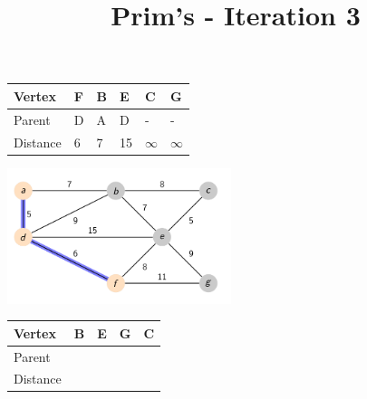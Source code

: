 \documentclass{beamer}
\begin{document}
\begin{frame}[fragile]
    \title{Prim's - Iteration 3}
    \centering
    \begin{table}[]
        \begin{tabular}{|l|l|l|l|l|l|}
            \hline
            Vertex   & F & B & E  & C        & G        \\ \hline
            Parent   & D & A & D  & -        & -        \\ \hline
            Distance & 6 & 7 & 15 & $\infty$ & $\infty$ \\ \hline
        \end{tabular}
    \end{table}
    \includegraphics[width=0.49\textwidth]{./imgs/prims_walkthrough/prims3.png}
    \begin{table}[]
        \begin{tabular}{|l|l|l|l|l|}
            \hline
            Vertex   & B & E & G  & C        \\ \hline
            Parent   &  &  &   &         \\ \hline
            Distance &  &  &  & \\ \hline
        \end{tabular}
    \end{table}

\end{frame}
\end{document}
